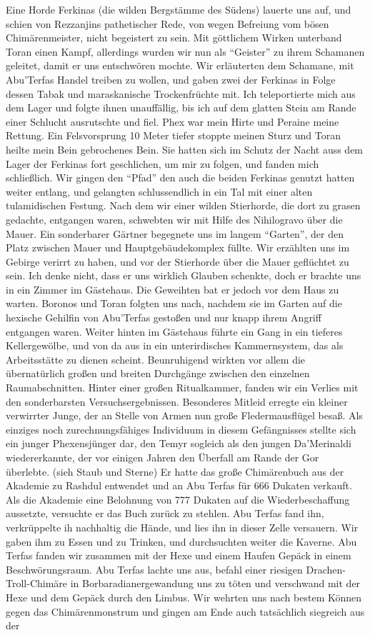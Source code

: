 Eine Horde Ferkinas (die wilden Bergstämme des Südens) lauerte uns auf, und schien von Rezzanjins pathetischer Rede, von wegen Befreiung vom bösen Chimärenmeister, nicht begeistert zu sein. Mit göttlichem Wirken unterband Toran einen Kampf, allerdings wurden wir nun als ``Geister'' zu ihrem Schamanen geleitet, damit er uns entschwören mochte.
Wir erläuterten dem Schamane, mit Abu'Terfas Handel treiben zu wollen, und gaben zwei der Ferkinas in Folge dessen Tabak und maraskanische Trockenfrüchte mit. Ich teleportierte mich aus dem Lager und folgte ihnen unauffällig, bis ich auf dem glatten Stein am Rande einer Schlucht ausrutschte und fiel. Phex war mein Hirte und Peraine meine Rettung. Ein Felsvorsprung 10 Meter tiefer stoppte meinen Sturz und Toran heilte mein Bein gebrochenes Bein. Sie hatten sich im Schutz der Nacht auss dem Lager der Ferkinas fort geschlichen, um mir zu folgen, und fanden mich schließlich. Wir gingen den ``Pfad'' den auch die beiden Ferkinas genutzt hatten weiter entlang, und gelangten schlussendlich in ein Tal mit einer alten tulamidischen Festung. Nach dem wir einer wilden Stierhorde, die dort zu grasen gedachte, entgangen waren, schwebten wir mit Hilfe des Nihilogravo über die Mauer. Ein sonderbarer Gärtner begegnete uns im langem ``Garten'', der den Platz zwischen Mauer und Hauptgebäudekomplex füllte. Wir erzählten uns im Gebirge verirrt zu haben, und vor der Stierhorde über die Mauer geflüchtet zu sein. Ich denke nicht, dass er uns wirklich Glauben schenkte, doch er brachte uns in ein Zimmer im Gästehaus. Die Geweihten bat er jedoch vor dem Haus zu warten. Boronos und Toran folgten uns nach, nachdem sie im Garten auf die hexische Gehilfin von Abu'Terfas gestoßen und nur knapp ihrem Angriff entgangen waren. Weiter hinten im Gästehaus führte ein Gang in ein tieferes Kellergewölbe, und von da aus in ein unterirdisches Kammernsystem, das als Arbeitsstätte zu dienen scheint. Beunruhigend wirkten vor allem die übernatürlich großen und breiten Durchgänge zwischen den einzelnen Raumabschnitten. Hinter einer großen Ritualkammer, fanden wir ein Verlies mit den sonderbarsten Versuchsergebnissen. Besonderes Mitleid erregte ein kleiner verwirrter Junge, der an Stelle von Armen nun große Fledermausflügel besaß. Als einziges noch zurechnungsfähiges Individuum in diesem Gefängnisses stellte sich ein junger Phexensjünger dar, den Temyr sogleich als den jungen Da'Merinaldi wiedererkannte, der vor einigen Jahren den Überfall am Rande der Gor überlebte. (sieh Staub und Sterne) Er hatte das große Chimärenbuch aus der Akademie zu Rashdul entwendet und an Abu Terfas für 666 Dukaten verkauft. Als die Akademie eine Belohnung von 777 Dukaten auf die Wiederbeschaffung aussetzte, versuchte er das Buch zurück zu stehlen. Abu Terfas fand ihn, verkrüppelte ih nachhaltig die Hände, und lies ihn in dieser Zelle versauern. Wir gaben ihm zu Essen und zu Trinken, und durchsuchten weiter die Kaverne. Abu Terfas fanden wir zusammen mit der Hexe und einem Haufen Gepäck in einem Beschwörungsraum. Abu Terfas lachte uns aus, befahl einer riesigen Drachen-Troll-Chimäre in Borbaradianergewandung uns zu töten und verschwand mit der Hexe und dem Gepäck durch den Limbus. Wir wehrten uns nach bestem Können gegen das Chimärenmonstrum und gingen am Ende auch tatsächlich siegreich aus der 